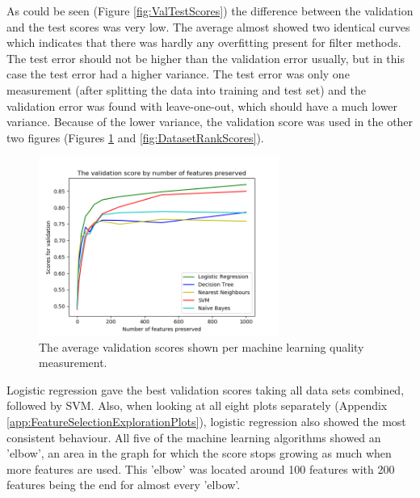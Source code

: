 \documentclass[10pt,a4paper]{article}
\begin{document}
	As could be seen (Figure \ref{fig:ValTestScores}) the difference between the validation and the test scores was very low. The average almost showed two identical curves which indicates that there was hardly any overfitting present for filter methods. The test error should not be higher than the validation error usually, but in this case the test error had a higher variance. The test error was only one measurement (after splitting the data into training and test set) and the validation error was found with leave-one-out, which should have a much lower variance. Because of the lower variance, the validation score was used in the other two figures (Figures \ref{fig:MachineLearningQualityScores} and \ref{fig:DatasetRankScores}).
	
	\begin{figure}[H]
		\includegraphics[width=0.7\textwidth]{Machine_Learning_Val_Scores.png}
		\caption{The average validation scores shown per machine learning quality measurement.}
		\label{fig:MachineLearningQualityScores}
	\end{figure}

	Logistic regression gave the best validation scores taking all data sets combined, followed by SVM. Also, when looking at all eight plots separately (Appendix \ref{app:FeatureSelectionExplorationPlots}), logistic regression also showed the most consistent behaviour. All five of the machine learning algorithms showed an 'elbow', an area in the graph for which the score stops growing as much when more features are used. This 'elbow' was located around 100 features with 200 features being the end for almost every 'elbow'.
\end{document}
